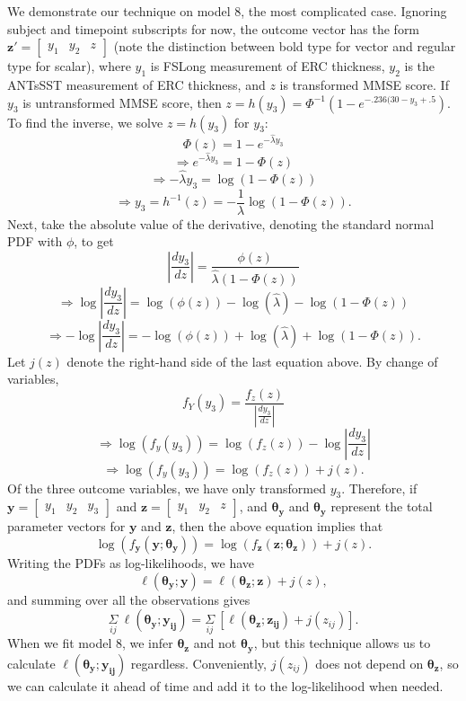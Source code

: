 \documentclass[12pt]{article}
\begin{document}
We demonstrate our technique on model 8, the most complicated case. Ignoring subject and timepoint subscripts for now, the outcome vector has the form $\boldsymbol{z}' = \begin{bmatrix} y_1 & y_2 & z \end{bmatrix}$ (note the distinction between bold type for vector and regular type for scalar), where $y_1$ is FSLong measurement of ERC thickness, $y_2$ is the ANTsSST measurement of ERC thickness, and $z$ is transformed MMSE score. If $y_3$ is untransformed MMSE score, then $z = h(y_3) = \Phi^{-1} (1 - e^{-.236 (30 - y_3 + .5})$. To find the inverse, we solve $z = h(y_3)$ for $y_3$:
$$ \Phi(z) = 1 - e^{-\hat{\lambda} y_3} $$
$$ \Rightarrow e^{-\hat{\lambda} y_3} = 1 - \Phi(z) $$
$$ \Rightarrow -\hat{\lambda} y_3 = \log(1 - \Phi(z)) $$
$$ \Rightarrow y_3 = h^{-1}(z) = -\frac{1}{\lambda} \log (1 - \Phi(z)). $$
Next, take the absolute value of the derivative, denoting the standard normal PDF with $\phi$, to get
$$ \left| \frac{dy_3}{dz} \right| = \frac{\phi(z)}{\hat{\lambda} (1 - \Phi(z))} $$
$$ \Rightarrow \log \left| \frac{dy_3}{dz} \right| = \log(\phi(z)) - \log(\hat{\lambda}) - \log(1 - \Phi(z)) $$
$$ \Rightarrow -\log \left| \frac{dy_3}{dz} \right| = -\log(\phi(z)) + \log(\hat{\lambda}) + \log(1 - \Phi(z)). $$
Let $j(z)$ denote the right-hand side of the last equation above. By change of variables, 
$$ f_Y(y_3)  = \frac{f_z(z)}{\left| \frac{dy_3}{dz} \right|} $$
$$ \Rightarrow \log(f_y(y_3)) = \log(f_z(z)) - \log \left| \frac{dy_3}{dz} \right| $$
$$ \Rightarrow \log(f_y(y_3)) = \log(f_z(z)) + j(z). $$
Of the three outcome variables, we have only transformed $y_3$. Therefore, if $\boldsymbol{y} = \begin{bmatrix} y_1 & y_2 & y_3 \end{bmatrix}$ and $\boldsymbol{z} = \begin{bmatrix} y_1 & y_2 & z   \end{bmatrix}$, and $\boldsymbol{\theta_y}$ and $\boldsymbol{\theta_y}$ represent the total parameter vectors for $\boldsymbol{y}$ and $\boldsymbol{z}$, then the above equation implies that
$$ \log(f_{\boldsymbol{y}}(\boldsymbol{y}; \boldsymbol{\theta_y})) = \log(f_{\boldsymbol{z}}(\boldsymbol{z}; \boldsymbol{\theta_z})) + j(z). $$
Writing the PDFs as log-likelihoods, we have 
$$ \ell(\boldsymbol{\theta_y}; \boldsymbol{y}) = \ell(\boldsymbol{\theta_z}; \boldsymbol{z}) + j(z), $$
and summing over all the observations gives
$$ \underset{ij}{\Sigma} ~ \ell(\boldsymbol{\theta_y}; \boldsymbol{y_{ij}}) = \underset{ij}{\Sigma} ~ \left[ \ell(\boldsymbol{\theta_z}; \boldsymbol{z_{ij}}) + j(z_{ij}) \right]. $$
When we fit model 8, we infer $\boldsymbol{\theta_z}$ and not $\boldsymbol{\theta_y}$, but this technique allows us to calculate $\ell(\boldsymbol{\theta_y}; \boldsymbol{y_{ij}})$ regardless. Conveniently, $j(z_{ij})$ does not depend on $\boldsymbol{\theta_z}$, so we can calculate it ahead of time and add it to the log-likelihood when needed. 
\end{document}
